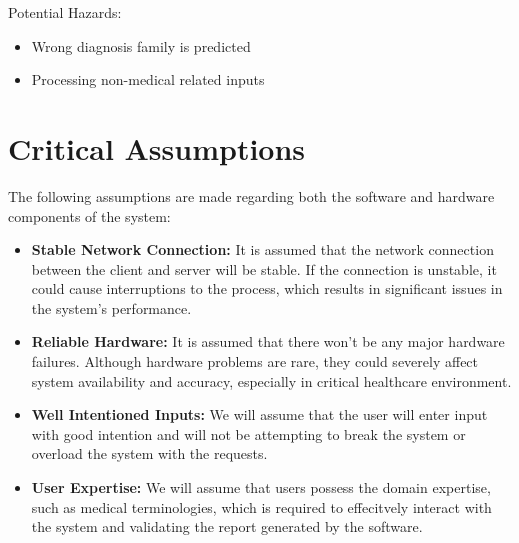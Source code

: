 \documentclass{article}
\begin{document}
\begin{itemize}
    Potential Hazards:
    \begin{itemize}
        \item Wrong diagnosis family is predicted
        \item Processing non-medical related inputs
    \end{itemize}
    
\end{itemize}


\section{Critical Assumptions}

The following assumptions are made regarding both the software and hardware components of the system:

\begin{itemize}
    \item \textbf{Stable Network Connection:} It is assumed that the network connection between the client and server will be stable. If the connection is unstable, it could cause interruptions to the process, which results in significant issues in the system’s performance.
        
    \item \textbf{Reliable Hardware:} It is assumed that there won’t be any major hardware failures. Although hardware problems are rare, they could severely affect system availability and accuracy, especially in critical healthcare environment.

    \item \textbf{Well Intentioned Inputs:} We will assume that the user will enter input with good intention and will not be attempting to break the system or overload the system with the requests.
    
    \item \textbf{User Expertise:} We will assume that users possess the domain expertise, such as medical terminologies, which is required to effecitvely interact with the system and validating the report generated by the software.
\end{itemize}
\end{document}
